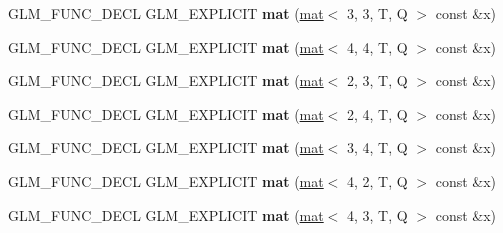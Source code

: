 \begin{DoxyCompactItemize}
G\+L\+M\+\_\+\+F\+U\+N\+C\+\_\+\+D\+E\+CL G\+L\+M\+\_\+\+E\+X\+P\+L\+I\+C\+IT {\bfseries mat} (\hyperlink{structglm_1_1mat}{mat}$<$ 3, 3, T, Q $>$ const \&x)
\item 
\mbox{\label{structglm_1_1mat_3_013_00_012_00_01T_00_01Q_01_4_a203b5bb05f9c622a129eed383b534dbf}} 
G\+L\+M\+\_\+\+F\+U\+N\+C\+\_\+\+D\+E\+CL G\+L\+M\+\_\+\+E\+X\+P\+L\+I\+C\+IT {\bfseries mat} (\hyperlink{structglm_1_1mat}{mat}$<$ 4, 4, T, Q $>$ const \&x)
\item 
\mbox{\label{structglm_1_1mat_3_013_00_012_00_01T_00_01Q_01_4_a02a38bcb970a1ea0bcfbdffd47d5ab3b}} 
G\+L\+M\+\_\+\+F\+U\+N\+C\+\_\+\+D\+E\+CL G\+L\+M\+\_\+\+E\+X\+P\+L\+I\+C\+IT {\bfseries mat} (\hyperlink{structglm_1_1mat}{mat}$<$ 2, 3, T, Q $>$ const \&x)
\item 
\mbox{\label{structglm_1_1mat_3_013_00_012_00_01T_00_01Q_01_4_a725b985f33607b04b0499ab9db9f88f1}} 
G\+L\+M\+\_\+\+F\+U\+N\+C\+\_\+\+D\+E\+CL G\+L\+M\+\_\+\+E\+X\+P\+L\+I\+C\+IT {\bfseries mat} (\hyperlink{structglm_1_1mat}{mat}$<$ 2, 4, T, Q $>$ const \&x)
\item 
\mbox{\label{structglm_1_1mat_3_013_00_012_00_01T_00_01Q_01_4_a659f1425c2dc271c63900f580438ebaf}} 
G\+L\+M\+\_\+\+F\+U\+N\+C\+\_\+\+D\+E\+CL G\+L\+M\+\_\+\+E\+X\+P\+L\+I\+C\+IT {\bfseries mat} (\hyperlink{structglm_1_1mat}{mat}$<$ 3, 4, T, Q $>$ const \&x)
\item 
\mbox{\label{structglm_1_1mat_3_013_00_012_00_01T_00_01Q_01_4_a9fb031465b55ade2e0b88d1fe4f20861}} 
G\+L\+M\+\_\+\+F\+U\+N\+C\+\_\+\+D\+E\+CL G\+L\+M\+\_\+\+E\+X\+P\+L\+I\+C\+IT {\bfseries mat} (\hyperlink{structglm_1_1mat}{mat}$<$ 4, 2, T, Q $>$ const \&x)
\item 
\mbox{\label{structglm_1_1mat_3_013_00_012_00_01T_00_01Q_01_4_ad21c6e812446fbae39cc3b98e2e0db0d}} 
G\+L\+M\+\_\+\+F\+U\+N\+C\+\_\+\+D\+E\+CL G\+L\+M\+\_\+\+E\+X\+P\+L\+I\+C\+IT {\bfseries mat} (\hyperlink{structglm_1_1mat}{mat}$<$ 4, 3, T, Q $>$ const \&x)
\item 

\end{DoxyCompactItemize}
